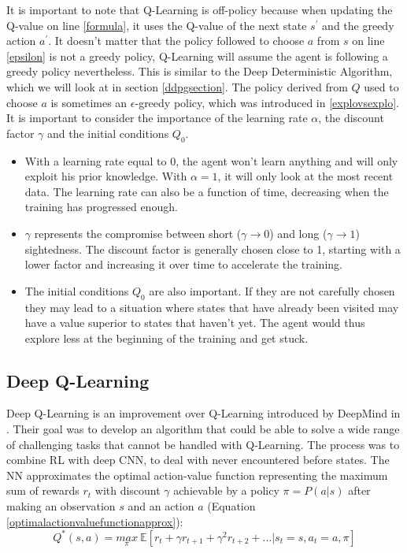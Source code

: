 It is important to note that Q-Learning is off-policy because when updating the Q-value on line \ref{formula}, it uses the Q-value of the next state $s^{'}$ and the greedy action $a^{'}$. It doesn't matter that the policy followed to choose $a$ from $s$ on line \ref{epsilon} is not a greedy policy, Q-Learning will assume the agent is following a greedy policy nevertheless. This is similar to the Deep Deterministic Algorithm, which we will look at in section \ref{ddpgsection}.
The policy derived from $Q$ used to choose $a$ is sometimes an $\epsilon$-greedy policy, which was introduced in \ref{explovsexplo}. 
\newline
It is important to consider the importance of the learning rate $\alpha$, the discount factor $\gamma$ and the initial conditions $Q_0$.
\begin{itemize}
	\item With a learning rate equal to 0, the agent won't learn anything and will only exploit his prior knowledge. With $\alpha = 1$, it will only look at the most recent data. The learning rate can also be a function of time, decreasing when the training has progressed enough.
	\item $\gamma$ represents the compromise between short ($\gamma \rightarrow 0$) and long ($\gamma \rightarrow 1$) sightedness. The discount factor is generally chosen close to 1, starting with a lower factor and increasing it over time to accelerate the training.
	\item The initial conditions $Q_0$ are also important. If they are not carefully chosen they may lead to a situation where states that have already been visited may have a value superior to states that haven't yet. The agent would thus explore less at the beginning of the training and get stuck.
\end{itemize}

\subsection{Deep Q-Learning}
\label{dqlearningsection}
Deep Q-Learning is an improvement over Q-Learning introduced by DeepMind in \cite{drl}. Their goal was to develop an algorithm that could be able to solve a wide range of challenging tasks that cannot be handled with Q-Learning. The process was to combine RL with deep CNN, to deal with never encountered before states. The NN approximates the optimal action-value function representing the maximum sum of rewards $r_t$ with discount $\gamma$ achievable by a policy $\pi = P(a|s)$ after making an observation $s$ and an action $a$ (Equation \ref{optimalactionvaluefunctionapprox}):
\begin{equation}
\label{optimalactionvaluefunctionapprox}
	Q^{*}(s,a) = \underset{\pi}{max}\: \mathbb{E} \left[r_t + \gamma r_{t+1} + \gamma^{2} r_{t+2} + ... | s_t=s,a_t=a,\pi\right]
\end{equation}


